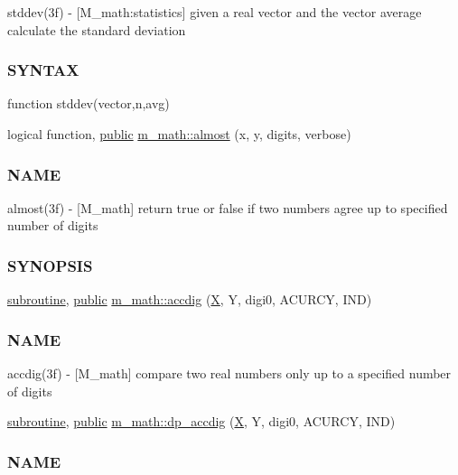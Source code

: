\begin{DoxyCompactItemize}
\begin{DoxyCompactList}
stddev(3f) -\/ \mbox{[}M\+\_\+math\+:statistics\mbox{]} given a real vector and the vector average calculate the standard deviation \subsubsection*{S\+Y\+N\+T\+AX}

function stddev(vector,n,avg) \end{DoxyCompactList}\item 
logical function, \hyperlink{M__stopwatch_83_8txt_a2f74811300c361e53b430611a7d1769f}{public} \hyperlink{namespacem__math_a5c6526b86e62cffde2dc20e53fd3be22}{m\+\_\+math\+::almost} (x, y, digits, verbose)
\begin{DoxyCompactList}\small\item\em \subsubsection*{N\+A\+ME}

almost(3f) -\/ \mbox{[}M\+\_\+math\mbox{]} return true or false if two numbers agree up to specified number of digits \subsubsection*{S\+Y\+N\+O\+P\+S\+IS}\end{DoxyCompactList}\item 
\hyperlink{M__stopwatch_83_8txt_acfbcff50169d691ff02d4a123ed70482}{subroutine}, \hyperlink{M__stopwatch_83_8txt_a2f74811300c361e53b430611a7d1769f}{public} \hyperlink{namespacem__math_a29d92d203eee5fb3ccf5fee7abce7450}{m\+\_\+math\+::accdig} (\hyperlink{intro__blas1_83_8txt_ac8596739bc875e90fe6e2ecf98e87906}{X}, Y, digi0, A\+C\+U\+R\+CY, I\+ND)
\begin{DoxyCompactList}\small\item\em \subsubsection*{N\+A\+ME}

accdig(3f) -\/ \mbox{[}M\+\_\+math\mbox{]} compare two real numbers only up to a specified number of digits \end{DoxyCompactList}\item 
\hyperlink{M__stopwatch_83_8txt_acfbcff50169d691ff02d4a123ed70482}{subroutine}, \hyperlink{M__stopwatch_83_8txt_a2f74811300c361e53b430611a7d1769f}{public} \hyperlink{namespacem__math_a08a8a6121a85932548baee1a0e3af4d9}{m\+\_\+math\+::dp\+\_\+accdig} (\hyperlink{intro__blas1_83_8txt_ac8596739bc875e90fe6e2ecf98e87906}{X}, Y, digi0, A\+C\+U\+R\+CY, I\+ND)
\begin{DoxyCompactList}\small\item\em \subsubsection*{N\+A\+ME}


\end{DoxyCompactList}
\end{DoxyCompactItemize}
